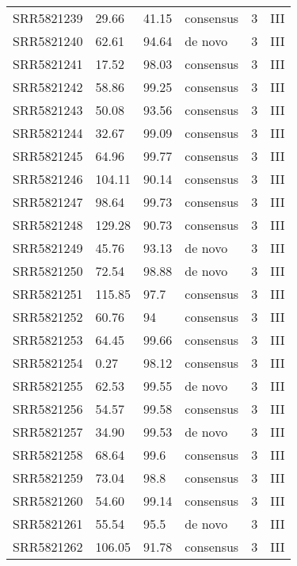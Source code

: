 \begin{scriptsize}
\begin{center}
\begin{longtable}{@{}llllll@{}}
SRR5821239 & 29.66         & 41.15       & consensus    & 3        & III      \\
SRR5821240 & 62.61         & 94.64       & de novo      & 3        & III      \\
SRR5821241 & 17.52         & 98.03       & consensus    & 3        & III      \\
SRR5821242 & 58.86         & 99.25       & consensus    & 3        & III      \\
SRR5821243 & 50.08         & 93.56       & consensus    & 3        & III      \\
SRR5821244 & 32.67         & 99.09       & consensus    & 3        & III      \\
SRR5821245 & 64.96         & 99.77       & consensus    & 3        & III      \\
SRR5821246 & 104.11        & 90.14       & consensus    & 3        & III      \\
SRR5821247 & 98.64         & 99.73       & consensus    & 3        & III      \\
SRR5821248 & 129.28        & 90.73       & consensus    & 3        & III      \\
SRR5821249 & 45.76         & 93.13       & de novo      & 3        & III      \\
SRR5821250 & 72.54         & 98.88       & de novo      & 3        & III      \\
SRR5821251 & 115.85        & 97.7        & consensus    & 3        & III      \\
SRR5821252 & 60.76         & 94          & consensus    & 3        & III      \\
SRR5821253 & 64.45         & 99.66       & consensus    & 3        & III      \\
SRR5821254 & 0.27          & 98.12       & consensus    & 3        & III      \\
SRR5821255 & 62.53         & 99.55       & de novo      & 3        & III      \\
SRR5821256 & 54.57         & 99.58       & consensus    & 3        & III      \\
SRR5821257 & 34.90         & 99.53       & de novo      & 3        & III      \\
SRR5821258 & 68.64         & 99.6        & consensus    & 3        & III      \\
SRR5821259 & 73.04         & 98.8        & consensus    & 3        & III      \\
SRR5821260 & 54.60         & 99.14       & consensus    & 3        & III      \\
SRR5821261 & 55.54         & 95.5        & de novo      & 3        & III      \\
SRR5821262 & 106.05        & 91.78       & consensus    & 3        & III     
\end{longtable}

\end{center}
\end{scriptsize}